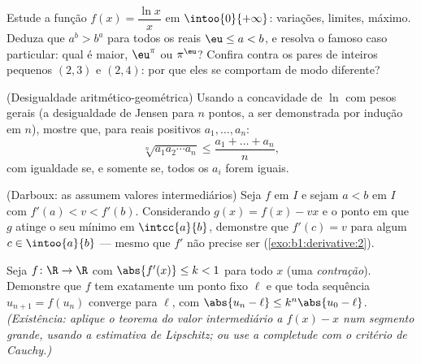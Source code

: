 \begin{exercise}[$\star\star$]\label{exo:b1:derivative:8}
Estude a função $f(x) = \dfrac{\ln x}{x}$ em
$\intoo{0}{+\infty}$: variações, limites, máximo. Deduza que $a^b
> b^a$ para todos os reais $\eu \leq a < b$, e resolva o famoso caso
particular: qual é maior, $\eu^\pi$ ou $\pi^\eu$? Confira contra os
pares de inteiros pequenos $(2,3)$ e $(2,4)$: por que eles se comportam
de modo diferente?
\end{exercise}

\begin{exercise}[$\star\star$]\label{exo:b1:derivative:9}
(Desigualdade aritmético-geométrica) Usando a concavidade de $\ln$ com
pesos gerais (a desigualdade de Jensen para $n$ pontos, a ser
demonstrada por indução em $n$), mostre que, para reais positivos
$a_1, \dots, a_n$:
\[
\sqrt[n]{a_1 a_2 \cdots a_n} \leq \frac{a_1 + \dots + a_n}{n},
\]
com igualdade se, e somente se, todos os $a_i$ forem iguais.
\end{exercise}

\begin{exercise}[$\star\star\star$]\label{exo:b1:derivative:10}
(Darboux: as  assumem valores intermediários) Seja $f$
 em $I$ e sejam $a < b$ em $I$ com $f'(a) < v < f'(b)$.
Considerando $g(x) = f(x) - vx$ e o ponto em que $g$ atinge
o seu mínimo em $\intcc{a}{b}$, demonstre que $f'(c) = v$ para algum $c
\in \intoo{a}{b}$ --- mesmo que $f'$ não precise ser 
(\cref{exo:b1:derivative:2}).
\end{exercise}

\begin{exercise}[$\star\star\star$]\label{exo:b1:derivative:11}
Seja $f \colon \R \to \R$  com $\abs{f'(x)} \leq k
< 1$ para todo $x$ (uma \emph{contração}). Demonstre que $f$ tem exatamente
um ponto fixo $\ell$ e que toda sequência $u_{n+1} = f(u_n)$
converge para $\ell$, com $\abs{u_n - \ell} \leq k^n\abs{u_0 -
\ell}$. \emph{(Existência: aplique o teorema do valor intermediário a
$f(x) - x$ num segmento grande, usando a estimativa de Lipschitz; ou
use a completude com o critério de Cauchy.)}
\end{exercise}

